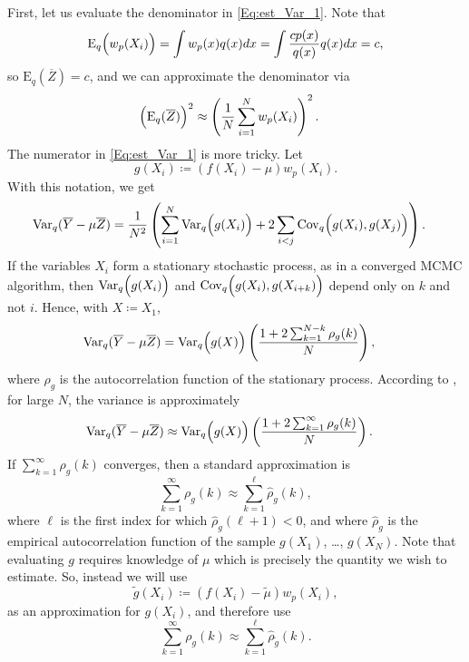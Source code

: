\documentclass{amsart}
\newcommand{\Var}{\mathrm{Var}}
\newcommand{\Cov}{\mathrm{Cov}}
\theoremstyle{plain}%
\begin{document}
First, let us evaluate the denominator in \cref{Eq:est_Var_1}.
Note that
\begin{equation}
\label{eq:expqwpxi}
\mathrm{E}_q\Bigl(w_p(X_i)\Bigr)
=\int w_p(x)q(x)dx
=\int \frac{c p(x)}{q(x)}q(x)dx
=c, 
\end{equation}
so $\mathrm{E}_q(\overline{Z})=c$, and we can approximate the denominator via
\begin{align}
\label{eq:eqzsquaredapprox}
\Bigl(\mathrm{E}_q(\overline{Z})\Bigr)^2
&\approx
\left(\frac{1}{N}\sum_{i=1}^N w_p(X_i)\right)^2. 
\end{align}
The numerator in \cref{Eq:est_Var_1} is more tricky.
Let
\begin{equation}
g(X_i)\coloneqq (f(X_i)-\mu) w_p(X_i). \label{Eq:g_tilde}
\end{equation}
With this notation, we get
\begin{align}
\Var_q(\overline{Y}-\mu\overline{Z})
& =  \frac{1}{N^2} \left ( 
\sum_{i = 1}^N \Var_q\Bigl(g(X_i)\Bigr)  + 2 \sum_{i < j } \Cov_q \Bigl (g(X_i), g(X_j) \Bigr) \right ). 
\end{align}
If the variables $X_i$ form a stationary stochastic process, as in a converged MCMC algorithm, then $\Var_q \Bigl(g(X_i)\Bigr)$ and  $\Cov_q\Bigl(g(X_i), g(X_{i+k})\Bigr)$ depend only on $k$ and not $i$.
Hence, with $X\coloneqq X_1$,
\begin{align}
\Var_q(\overline{Y}-\mu\overline{Z})
& = 
\Var_q\Bigl(g(X)\Bigr) \left ( \frac{1  + 2 \sum_{k=1}^{N-k} \rho_{g}(k)}{N} \right ), \label{Eq:Var_g_n-k}
\end{align}
where $\rho_{g}$ is the autocorrelation function of the stationary process.
According to \citep{Geyer_1992}, for large $N$, 
the variance is approximately 
\begin{align}
\Var_q(\overline{Y}-\mu\overline{Z})
& \approx
\Var_q\Bigl(g(X)\Bigr) \left ( \frac{1  + 2 \sum_{k=1}^\infty \rho_{g}(k)}{N} \right ). \label{Eq:Var_g}
\end{align}
If $\sum_{k=1}^\infty \rho_{g}(k)$ converges, then a standard approximation is \citep{Geyer_1992, Givens_2012}
\begin{equation}
\sum_{k=1}^\infty \rho_{g}(k)\approx \sum_{k=1}^\ell \hat{\rho}_{g}(k), 
\end{equation}
where $\ell$ is the first index for which $\hat{\rho}_{g}(\ell+1)<0$,
and where $\hat{\rho}_g$ is the empirical autocorrelation function of
the sample $g(X_1)$, \dots, $g(X_N)$. 
Note that evaluating $g$ requires knowledge of $\mu$ which is precisely
the quantity we wish to estimate. So, instead we will use
\begin{equation}
    \tilde{g}(X_i)
    \coloneqq (f(X_i) - \widetilde{\mu})w_p(X_i), 
\end{equation}
as an approximation for $g(X_i)$, and therefore use
\begin{equation}
\label{eq:approxsumrho}
\sum_{k=1}^\infty \rho_{g}(k)\approx \sum_{k=1}^\ell \hat{\rho}_{\tilde{g}}(k).
\end{equation}
\end{document}
